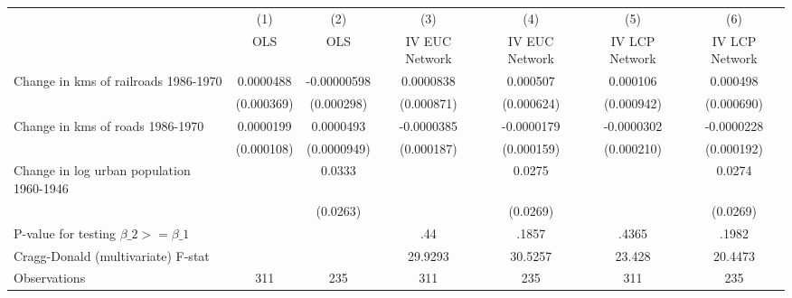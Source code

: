 {
\def\sym#1{\ifmmode^{#1}\else\(^{#1}\)\fi}
\begin{tabular}{l*{6}{c}}
\hline\hline
                &\multicolumn{1}{c}{(1)}&\multicolumn{1}{c}{(2)}&\multicolumn{1}{c}{(3)}&\multicolumn{1}{c}{(4)}&\multicolumn{1}{c}{(5)}&\multicolumn{1}{c}{(6)}\\
                &\multicolumn{1}{c}{OLS}&\multicolumn{1}{c}{OLS}&\multicolumn{1}{c}{IV EUC Network}&\multicolumn{1}{c}{IV EUC Network}&\multicolumn{1}{c}{IV LCP Network}&\multicolumn{1}{c}{IV LCP Network}\\
\hline
Change in kms of railroads 1986-1970&0.0000488         &-0.00000598         &0.0000838         & 0.000507         & 0.000106         & 0.000498         \\
                &(0.000369)         &(0.000298)         &(0.000871)         &(0.000624)         &(0.000942)         &(0.000690)         \\
[1em]
Change in kms of roads 1986-1970&0.0000199         &0.0000493         &-0.0000385         &-0.0000179         &-0.0000302         &-0.0000228         \\
                &(0.000108)         &(0.0000949)         &(0.000187)         &(0.000159)         &(0.000210)         &(0.000192)         \\
[1em]
Change in log urban population 1960-1946&                  &   0.0333         &                  &   0.0275         &                  &   0.0274         \\
                &                  & (0.0263)         &                  & (0.0269)         &                  & (0.0269)         \\
\hline
P-value for testing $\beta\_{2} >= \beta\_{1}$&                  &                  &      .44         &    .1857         &    .4365         &    .1982         \\
Cragg-Donald (multivariate) F-stat&                  &                  &  29.9293         &  30.5257         &   23.428         &  20.4473         \\
Observations    &      311         &      235         &      311         &      235         &      311         &      235         \\
\hline\hline
\end{tabular}
}
